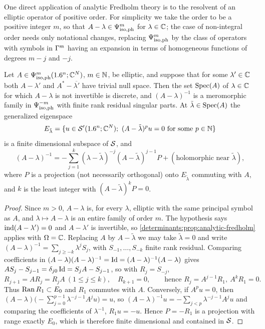 One direct application of analytic Fredholm theory is to the resolvent of an
elliptic operator of positive order. For simplicity we take the order to be a
positive integer $m$, so that $A-\lambda\in\Psi^{m}_{\mathrm{iso,ph}}$ for $\lambda\in\mathbb{C}$; the
case of non-integral order needs only notational changes, replacing
$\Psi^{m}_{\mathrm{iso,ph}}$ by the class of operators with symbols in $\Gamma^{m}$ having an
expansion in terms of homogeneous functions of degrees $m-j$ and $-j$.

\begin{proposition}\label{determinants:prop:resolvent}
  Let $A\in\Psi^{m}_{\mathrm{iso,ph}}(1.6^n;\mathbb{C}^N)$, $m\in\mathbb{N}$, be elliptic, and suppose that for
  some $\lambda'\in\mathbb{C}$ both $A-\lambda'$ and $A^*-\overline{\lambda'}$ have
  trivial null space. Then the set $\operatorname{Spec}(A)$ of $\lambda\in\mathbb{C}$ for which
  $A-\lambda$ is not invertible is discrete, and $(A-\lambda)^{-1}$ is a
  meromorphic family in $\Psi^{-m}_{\mathrm{iso,ph}}$ with finite rank residual singular
  parts. At $\tilde\lambda\in\operatorname{Spec}(A)$ the generalized eigenspace
  \begin{equation*}
    E_{\tilde\lambda}=\{u\in\cSp(\R^n;\C^N);\ (A-\tilde\lambda)^pu=0\text{ for some }p\in\N\}
  \end{equation*}
  is a finite dimensional subspace of $\mathcal{S}$, and
  \begin{equation*}
    (A-\lambda)^{-1}=-\sum_{j=1}^k(\lambda-\tilde\lambda)^{-j}(A-\tilde\lambda)^{j-1}P+(\text{holomorphic near }\tilde\lambda),
  \end{equation*}
  where $P$ is a projection (not necessarily orthogonal) onto $E_{\tilde\lambda}$
  commuting with $A$, and $k$ is the least integer with $(A-\tilde\lambda)^kP=0$.
\end{proposition}
\begin{proof}
  Since $m>0$, $A-\lambda$ is, for every $\lambda$, elliptic with the same
  principal symbol as $A$, and $\lambda\mapsto A-\lambda$ is an entire family
  of order $m$. The hypothesis says $\operatorname{ind}(A-\lambda')=0$ and $A-\lambda'$ is
  invertible, so \cref{determinants:prop:analytic-fredholm} applies with
  $\Omega=\mathbb{C}$. Replacing $A$ by $A-\tilde\lambda$ we may take $\tilde\lambda=0$
  and write $(A-\lambda)^{-1}=\sum_{j\ge-k}\lambda^jS_j$, with $S_{-1},\dots,S_{-k}$
  finite rank residual. Comparing coefficients in
  $(A-\lambda)(A-\lambda)^{-1}=\operatorname{Id}=(A-\lambda)^{-1}(A-\lambda)$ gives
  $AS_j-S_{j-1}=\delta_{j0}\operatorname{Id}=S_jA-S_{j-1}$, so with $R_j=S_{-j}$,
  \begin{equation*}
    R_{j+1}=AR_j=R_jA\ (1\le j\le k),\quad R_{k+1}=0,\qquad\text{hence } R_j=A^{j-1}R_1,\ A^kR_1=0.
  \end{equation*}
  Thus $\operatorname{Ran} R_1\subset E_0$ and $R_1$ commutes with $A$. Conversely, if $A^pu=0$,
  then $(A-\lambda)\bigl(-\sum_{j=0}^{p-1}\lambda^{-j-1}A^ju\bigr)=u$, so
  $(A-\lambda)^{-1}u=-\sum_{j<p}\lambda^{-j-1}A^ju$ and comparing the
  coefficients of $\lambda^{-1}$, $R_1u=-u$. Hence $P=-R_1$ is a projection
  with range exactly $E_0$, which is therefore finite dimensional and contained
  in $\mathcal{S}$.
\end{proof}

